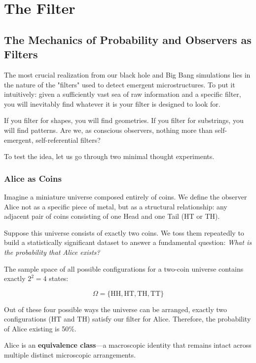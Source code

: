 \chapter{The Filter}
\label{the-filter}

\section{The Mechanics of Probability and Observers as Filters}

The most crucial realization from our black hole and Big Bang simulations lies in the nature of the "filters" used to detect emergent microstructures.
To put it intuitively: given a sufficiently vast sea of raw information and a specific filter, you will inevitably find whatever it is your filter is designed to look for. 

If you filter for shapes, you will find geometries.
If you filter for substrings, you will find patterns.
Are we, as conscious observers, nothing more than self-emergent, self-referential filters?

To test the idea, let us go through two minimal thought experiments.


\subsection{Alice as Coins}

Imagine a miniature universe composed entirely of coins. We define the observer Alice not as a specific piece of metal, but as a structural relationship: any adjacent pair of coins consisting of one Head and one Tail (HT or TH).

Suppose this universe consists of exactly two coins.
We toss them repeatedly to build a statistically significant dataset to answer a fundamental question: \emph{What is the probability that Alice exists?}

The sample space of all possible configurations for a two-coin universe contains exactly $2^2 = 4$ states:

\[
\Omega = \{\text{HH}, \text{HT}, \text{TH}, \text{TT}\}
\]

Out of these four possible ways the universe can be arranged, exactly two configurations ($\text{HT}$ and $\text{TH}$) satisfy our filter for Alice.
Therefore, the probability of Alice existing is 50\%. 

Alice is an \textbf{equivalence class}—a macroscopic identity that remains intact across multiple distinct microscopic arrangements.


